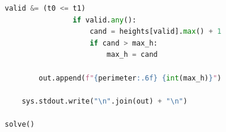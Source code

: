 \begin{lstlisting}[language=Python]
                valid &= (t0 <= t1)
                if valid.any():
                    cand = heights[valid].max() + 1
                    if cand > max_h:
                        max_h = cand

        out.append(f"{perimeter:.6f} {int(max_h)}")

    sys.stdout.write("\n".join(out) + "\n")

solve()
\end{lstlisting}
